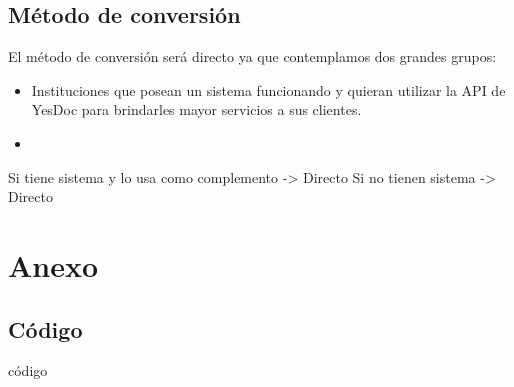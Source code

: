 \documentclass[a4paper,12pt]{article}
\begin{document}
\subsection{Método de conversión}
El método de conversión será directo ya que contemplamos dos grandes grupos:
\begin{itemize}
	\item Instituciones que posean un sistema funcionando y quieran utilizar la API de YesDoc para brindarles mayor servicios a sus clientes.
	\item
\end{itemize}
Si tiene sistema y lo usa como complemento -> Directo
Si no tienen sistema -> Directo

\newpage
\appendix 
\section{Anexo}
\subsection{Código} \label{codigo}
código


\newpage

\nocite{*}
\printbibliography[
heading=bibintoc
]
\end{document}
